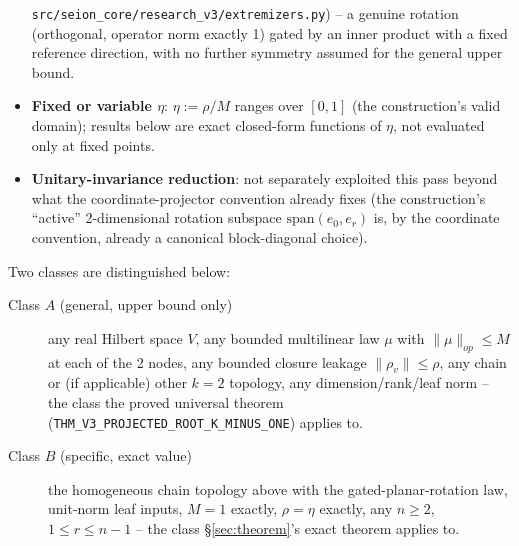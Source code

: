 \begin{itemize}
    \texttt{src/seion\_core/research\_v3/extremizers.py}) -- a genuine
    rotation (orthogonal, operator norm exactly 1) gated by an inner
    product with a fixed reference direction, with no further symmetry
    assumed for the general upper bound.
  \item \textbf{Fixed or variable $\eta$}: $\eta := \rho/M$ ranges over
    $[0,1]$ (the construction's valid domain); results below are exact
    closed-form functions of $\eta$, not evaluated only at fixed points.
  \item \textbf{Unitary-invariance reduction}: not separately exploited
    this pass beyond what the coordinate-projector convention already
    fixes (the construction's ``active'' 2-dimensional rotation subspace
    $\mathrm{span}(e_0, e_r)$ is, by the coordinate convention, already a
    canonical block-diagonal choice).
\end{itemize}

Two classes are distinguished below:
\begin{description}
  \item[Class $A$ (general, upper bound only)] any real Hilbert space
    $V$, any bounded multilinear law $\mu$ with $\|\mu\|_{op} \le M$ at
    each of the 2 nodes, any bounded closure leakage $\|\rho_v\| \le
    \rho$, any chain or (if applicable) other $k=2$ topology, any
    dimension/rank/leaf norm -- the class the proved universal theorem
    (\texttt{THM\_V3\_PROJECTED\_ROOT\_K\_MINUS\_ONE}) applies to.
  \item[Class $B$ (specific, exact value)] the homogeneous chain
    topology above with the gated-planar-rotation law, unit-norm leaf
    inputs, $M=1$ exactly, $\rho = \eta$ exactly, any $n\ge 2$,
    $1\le r\le n-1$ -- the class \S\ref{sec:theorem}'s exact theorem
    applies to.
\end{description}
